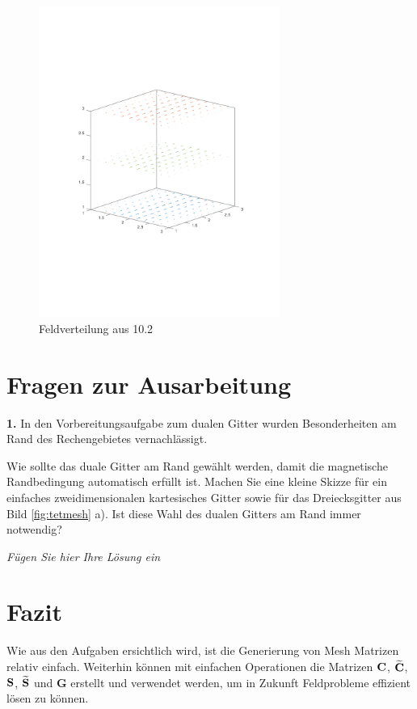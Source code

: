\documentclass[Protokollheft.tex]{subfiles}
\begin{document}
	\begin{figure}[h]
		\centering
		\includegraphics[trim = 15mm 65mm 15mm 60mm, clip, width=0.7\textwidth]{10_2.pdf}
		\caption{Feldverteilung aus 10.2}
		\label{Abb:10_2}
	\end{figure}

\section{Fragen zur Ausarbeitung}

\begin{framed}
	\noindent \textbf{1.} In den Vorbereitungsaufgabe zum dualen Gitter wurden
Besonderheiten am Rand des Rechengebietes vernachlässigt.

Wie sollte das duale Gitter am Rand gewählt werden, damit die magnetische
Randbedingung automatisch erfüllt ist. Machen Sie eine kleine Skizze
für ein einfaches zweidimensionalen kartesisches Gitter sowie für
das Dreiecksgitter aus Bild \ref{fig:tetmesh} a). Ist diese Wahl
des dualen Gitters am Rand immer notwendig?\label{exer:autoHomNeumann}
\end{framed}

\emph{Fügen Sie hier Ihre Lösung ein}



\section{Fazit}
Wie aus den Aufgaben ersichtlich wird, ist die Generierung von Mesh Matrizen relativ einfach. Weiterhin können mit einfachen Operationen die Matrizen $\mathbf{C}$, $\widetilde{\mathbf{C}}$, $\mathbf{S}$, $\widetilde{\mathbf{S}}$ und $\mathbf{G}$ erstellt und verwendet werden, um in Zukunft Feldprobleme effizient lösen zu können. 
\end{document}
